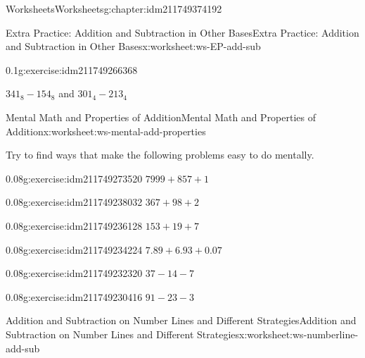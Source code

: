 \documentclass[twoside,11pt,]{book}
\begin{document}
\begin{chapterptx}{Worksheets}{}{Worksheets}{}{}{g:chapter:idm211749374192}
\begin{worksheet-section-numberless}{Extra Practice: Addition and Subtraction in Other Bases}{}{Extra Practice: Addition and Subtraction in Other Bases}{}{}{x:worksheet:ws-EP-add-sub}
\begin{divisionexercise}{2}{}{0.1}{g:exercise:idm211749266368}
\par
\(341_8 - 154_8 \) and \(301_4 -213_4\)%
\end{divisionexercise}%
\end{worksheet-section-numberless}
\restoregeometry
%
%
\typeout{************************************************}
\typeout{************************************************}
%
\begin{worksheet-section-numberless}{Mental Math and Properties of Addition}{}{Mental Math and Properties of Addition}{}{}{x:worksheet:ws-mental-add-properties}
\begin{introduction}{}%
Try to find ways that make the following problems easy to do mentally.%
\end{introduction}%
\begin{divisionexercise}{1}{}{0.08}{g:exercise:idm211749273520}%
\(7999+857+1\)%
\end{divisionexercise}%
\begin{divisionexercise}{2}{}{0.08}{g:exercise:idm211749238032}%
\(367+98+2\)%
\end{divisionexercise}%
\begin{divisionexercise}{3}{}{0.08}{g:exercise:idm211749236128}%
\(153+19+7\)%
\end{divisionexercise}%
\begin{divisionexercise}{4}{}{0.08}{g:exercise:idm211749234224}%
\(7.89+6.93+0.07\)%
\end{divisionexercise}%
\begin{divisionexercise}{5}{}{0.08}{g:exercise:idm211749232320}%
\(37-14-7\)%
\end{divisionexercise}%
\begin{divisionexercise}{6}{}{0.08}{g:exercise:idm211749230416}%
\(91-23-3\)%
\end{divisionexercise}%
\end{worksheet-section-numberless}
\restoregeometry
%
%
\typeout{************************************************}
\typeout{************************************************}
%
\begin{worksheet-section-numberless}{Addition and Subtraction on Number Lines and Different Strategies}{}{Addition and Subtraction on Number Lines and Different Strategies}{}{}{x:worksheet:ws-numberline-add-sub}

\end{worksheet-section-numberless}
\end{chapterptx}
\end{document}
